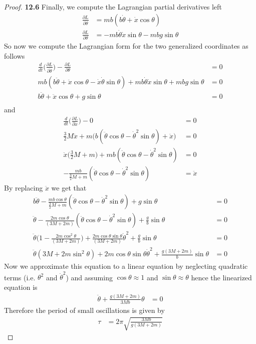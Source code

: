 \documentclass[11pt]{article}
\theoremstyle{definition}
\begin{document}
\begin{proof}{\textbf{12.6}}
    Finally, we compute the Lagrangian partial derivatives left
    \begin{align*}
        \frac{\partial L}{\partial \dot\theta} &= mb(b\dot{\theta}
        + \dot x\cos\theta)\\
        \frac{\partial L}{\partial \theta} &= -mb\dot\theta\dot x\sin\theta 
        -mbg\sin\theta 
    \end{align*}
    So now we compute the Lagrangian form for the two generalized coordinates
    as follows
    \begin{align*}
        \frac{d}{dt}\bigg(\frac{\partial L}{\partial \dot\theta}\bigg)
        - \frac{\partial L}{\partial \theta} &= 0\\
        mb(b\ddot{\theta} + \ddot x\cos\theta - \dot x\dot\theta\sin\theta)
        + mb\dot\theta\dot x\sin\theta  + mbg\sin\theta &= 0\\
        b\ddot{\theta} + \ddot x\cos\theta 
        + g\sin\theta &= 0\\
    \end{align*}
    and 
    \begin{align*}
        \frac{d}{dt}\bigg(\frac{\partial L}{\partial \dot x}\bigg) - 0 &= 0\\
        \frac{3}{2}M\ddot{x}
        + m\bigg(b(\ddot\theta\cos\theta
        - \dot\theta^2\sin\theta) + \ddot x\bigg) &= 0\\
        \ddot{x}\bigg(\frac{3}{2}M + m\bigg)
        + mb(\ddot\theta\cos\theta
        - \dot\theta^2\sin\theta) &= 0\\
        -\frac{mb}{\frac{3}{2}M + m}(\ddot\theta\cos\theta
        - \dot\theta^2\sin\theta) &= \ddot x
    \end{align*}
    By replacing $\ddot x$ we get that
    \begin{align*}
        b\ddot{\theta}
        - \frac{mb\cos\theta}{\frac{3}{2}M + m}(\ddot\theta\cos\theta
        - \dot\theta^2\sin\theta)
        + g\sin\theta &= 0\\
        \ddot{\theta}
        - \frac{2m\cos\theta}{(3M + 2m)}(\ddot\theta\cos\theta
        - \dot\theta^2\sin\theta)
        + \frac{g}{b}\sin\theta &= 0\\
        \ddot{\theta}\bigg( 
        1 - \frac{2m\cos^2\theta}{(3M + 2m)}\bigg)
        + \frac{2m\cos\theta\sin\theta}{(3M + 2m)}\dot\theta^2
        + \frac{g}{b}\sin\theta &= 0\\
        \ddot{\theta}(3M + 2m\sin^2\theta)
        + 2m\cos\theta\sin\theta\dot\theta^2
        + \frac{g(3M + 2m)}{b}\sin\theta &= 0
    \end{align*}
    Now we approximate this equation to a linear equation by neglecting
    quadratic terms (i.e. $\theta^2$ and $\dot\theta^2$) and assuming
    $\cos\theta \approx 1$ and $\sin\theta \approx \theta$ hence the
    linearized equation is
    \begin{align*}
        \ddot{\theta} + \frac{g(3M + 2m)}{3Mb} \theta &= 0
    \end{align*}
    Therefore the period of small oscillations is given by
    \begin{align*}
        \tau &= 2\pi\sqrt{\frac{3Mb}{g(3M + 2m)}}
    \end{align*}
\end{proof}
\end{document}
